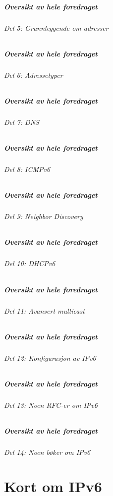 \begin{frame}
  \frametitle{Oversikt av hele foredraget}
  \framesubtitle{Del 5: Grunnleggende om adresser}
  \tableofcontents[part=5]
\end{frame}

\begin{frame}
  \frametitle{Oversikt av hele foredraget}
  \framesubtitle{Del 6: Adressetyper}
  \tableofcontents[part=6]
\end{frame}

\begin{frame}
  \frametitle{Oversikt av hele foredraget}
  \framesubtitle{Del 7: DNS}
  \tableofcontents[part=7]
\end{frame}

\begin{frame}
  \frametitle{Oversikt av hele foredraget}
  \framesubtitle{Del 8: ICMPv6}
  \tableofcontents[part=8]
\end{frame}

\begin{frame}
  \frametitle{Oversikt av hele foredraget}
  \framesubtitle{Del 9: Neighbor Discovery}
  \tableofcontents[part=9]
\end{frame}

\begin{frame}
  \frametitle{Oversikt av hele foredraget}
  \framesubtitle{Del 10: DHCPv6}
  \tableofcontents[part=10]
\end{frame}

\begin{frame}
  \frametitle{Oversikt av hele foredraget}
  \framesubtitle{Del 11: Avansert multicast}
  \tableofcontents[part=11]
\end{frame}

\begin{frame}
  \frametitle{Oversikt av hele foredraget}
  \framesubtitle{Del 12: Konfigurasjon av IPv6}
  \tableofcontents[part=12]
\end{frame}

\begin{frame}
  \frametitle{Oversikt av hele foredraget}
  \framesubtitle{Del 13: Noen RFC-er om IPv6}
  \tableofcontents[part=13]
\end{frame}

\begin{frame}
  \frametitle{Oversikt av hele foredraget}
  \framesubtitle{Del 14: Noen bøker om IPv6}
  \tableofcontents[part=14]
\end{frame}

\part{Kort om IPv6}

